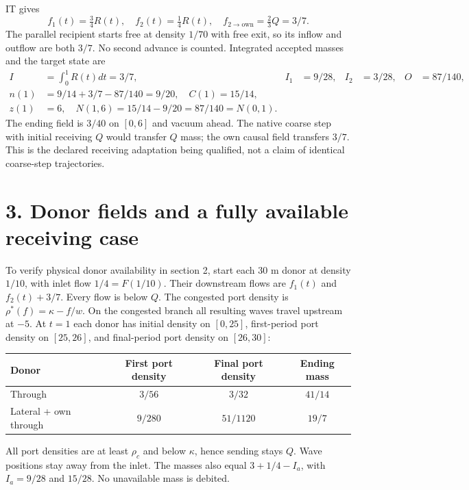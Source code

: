 \documentclass[11pt,a4paper]{article}
\begin{document}
IT gives
\begin{equation}
 f_1(t)=\tfrac34R(t),\quad f_2(t)=\tfrac14R(t),\quad
 f_{2\to\mathrm{own}}=\tfrac23Q=3/7.
\end{equation}
The parallel recipient starts free at density $1/70$ with free exit, so its
inflow and outflow are both $3/7$. No second advance is counted. Integrated
accepted masses and the target state are
\begin{align}
 I&=\int_0^1R(t)dt=3/7,& I_1&=9/28,& I_2&=3/28,& O&=87/140,\\
 n(1)&=9/14+3/7-87/140=9/20,\quad C(1)=15/14,\\
 z(1)&=6,\quad N(1,6)=15/14-9/20=87/140=N(0,1).
\end{align}
The ending field is $3/40$ on $[0,6]$ and vacuum ahead. The native coarse
step with initial receiving $Q$ would transfer $Q$ mass; the own causal
field transfers $3/7$. This is the declared receiving adaptation being
qualified, not a claim of identical coarse-step trajectories.

\newpage
\section*{3. Donor fields and a fully available receiving case}
To verify physical donor availability in section 2, start each 30 m donor
at density $1/10$, with inlet flow $1/4=F(1/10)$. Their downstream flows
are $f_1(t)$ and $f_2(t)+3/7$. Every flow is below $Q$. The congested
port density is $\rho^*(f)=\kappa-f/w$. On the congested branch all
resulting waves travel upstream at $-5$. At $t=1$ each donor has initial
density on $[0,25]$, first-period port density on $[25,26]$, and final-period
port density on $[26,30]$:
\begin{center}
\begin{tabular}{lccc}
\toprule
Donor & First port density & Final port density & Ending mass\\
\midrule
Through & $3/56$ & $3/32$ & $41/14$\\
Lateral + own through & $9/280$ & $51/1120$ & $19/7$\\
\bottomrule
\end{tabular}
\end{center}
All port densities are at least $\rho_c$ and below $\kappa$, hence sending
stays $Q$. Wave positions stay away from the inlet. The masses also equal
$3+1/4-I_a$, with $I_a=9/28$ and $15/28$. No unavailable mass is debited.
\end{document}
